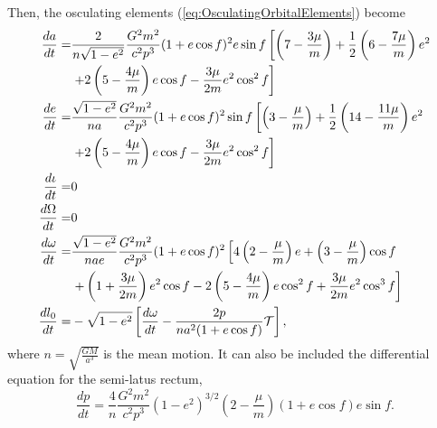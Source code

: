 Then, the osculating elements (\ref{eq:OsculatingOrbitalElements}) become
\begin{subequations}\label{eq:PNBinaryOsculatingElementsint}
\begin{align}
\frac{da}{dt} = &\frac{2}{n \sqrt{1-e^2}} \frac{G^2m^2}{c^2 p^3} (1+e \cos f)^2 e \sin f \left[ \left( 7 - \frac{3\mu}{m} \right) + \frac{1}{2} \left( 6 - \frac{7\mu}{m} \right) e^2 \right. \notag \\
& \left. + 2 \left( 5 - \frac{4\mu}{m} \right) e \cos f - \frac{3\mu}{2m} e^2 \cos ^2 f \right] \\
\frac{de}{dt} = &\frac{\sqrt{1-e^2}}{na}  \frac{G^2m^2}{c^2 p^3} (1+e \cos f)^2  \sin f  \left[ \left( 3 - \frac{\mu}{m} \right) + \frac{1}{2} \left( 14 - \frac{11\mu}{m} \right) e^2 \right. \notag \\
& \left. + 2 \left( 5 - \frac{4\mu}{m} \right) e \cos f - \frac{3\mu}{2m} e^2 \cos ^2 f \right] \\
\frac{d \iota}{dt} = & 0 \\
\frac{d \Omega}{dt} = & 0 \\
\frac{d\omega}{dt} =& \frac{\sqrt{1-e^2}}{nae}  \frac{G^2m^2}{c^2 p^3} (1+e \cos f)^2  \left[ 4\left( 2 - \frac{\mu}{m} \right)e + \left( 3 - \frac{\mu}{m} \right) \cos f \right. \notag \\
& \left. + \left( 1 + \frac{3\mu}{2m} \right) e^2 \cos f -2 \left( 5 - \frac{4\mu}{m} \right) e \cos^2 f + \frac{3\mu}{2m} e^2 \cos ^3 f \right] \\
\frac{dl_0}{dt} = &-\sqrt{1-e^2} \left[ \frac{d\omega}{dt} - \frac{2p}{na^2 (1+e \cos f)} \mathcal{T} \right] ,
\end{align}
\end{subequations}
where $n = \sqrt{\frac{GM}{a^3}}$ is the mean motion.  It can also be included the differential equation for the semi-latus rectum,
\begin{equation}
\frac{dp}{dt} = \frac{4}{n}\frac{G^2m^2}{c^2 p^3} (1-e^2)^{3/2} \left( 2- \frac{\mu}{m} \right) (1+e \cos f)e \sin f.
\end{equation}

